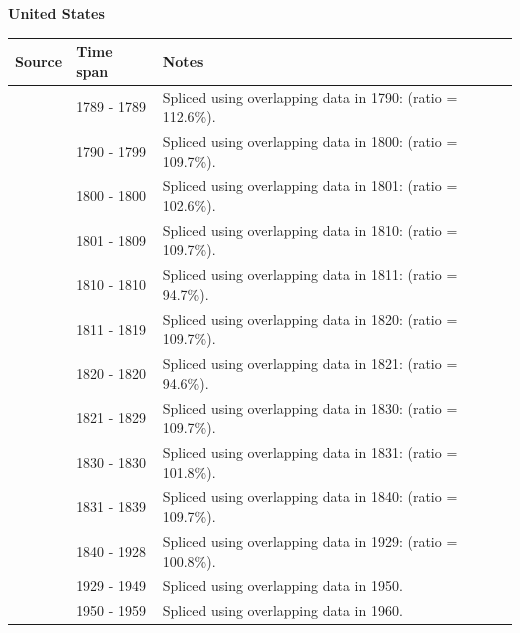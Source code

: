 \documentclass[12pt,a4paper,landscape]{article}
\begin{document}
\begin{adjustbox}{max totalsize={\paperwidth}{\paperheight},center}
\begin{minipage}[t][\textheight][t]{\textwidth}
\vspace*{0.5cm}
{}
\begin{center}
{\Large\bfseries United States}
\end{center}
\vspace{0.5cm}
\begin{table}[H]
\centering
\small
\begin{tabular}{|l|l|l|}
\hline
\textbf{Source} & \textbf{Time span} & \textbf{Notes} \\
\hline
\rowcolor{white}\cite{Mitchell}& 1789 - 1789 &Spliced using overlapping data in 1790: (ratio = 112.6\%).\\
\rowcolor{lightgray}\cite{MW}& 1790 - 1799 &Spliced using overlapping data in 1800: (ratio = 109.7\%).\\
\rowcolor{white}\cite{CS2_USA}& 1800 - 1800 &Spliced using overlapping data in 1801: (ratio = 102.6\%).\\
\rowcolor{lightgray}\cite{MW}& 1801 - 1809 &Spliced using overlapping data in 1810: (ratio = 109.7\%).\\
\rowcolor{white}\cite{CS2_USA}& 1810 - 1810 &Spliced using overlapping data in 1811: (ratio = 94.7\%).\\
\rowcolor{lightgray}\cite{MW}& 1811 - 1819 &Spliced using overlapping data in 1820: (ratio = 109.7\%).\\
\rowcolor{white}\cite{CS2_USA}& 1820 - 1820 &Spliced using overlapping data in 1821: (ratio = 94.6\%).\\
\rowcolor{lightgray}\cite{MW}& 1821 - 1829 &Spliced using overlapping data in 1830: (ratio = 109.7\%).\\
\rowcolor{white}\cite{CS2_USA}& 1830 - 1830 &Spliced using overlapping data in 1831: (ratio = 101.8\%).\\
\rowcolor{lightgray}\cite{MW}& 1831 - 1839 &Spliced using overlapping data in 1840: (ratio = 109.7\%).\\
\rowcolor{white}\cite{CS2_USA}& 1840 - 1928 &Spliced using overlapping data in 1929: (ratio = 100.8\%).\\
\rowcolor{lightgray}\cite{CS1_USA}& 1929 - 1949 &Spliced using overlapping data in 1950.\\
\rowcolor{white}\cite{IMF_IFS}& 1950 - 1959 &Spliced using overlapping data in 1960.\\

\end{tabular}
\end{table}
\end{minipage}
\end{adjustbox}
\end{document}
